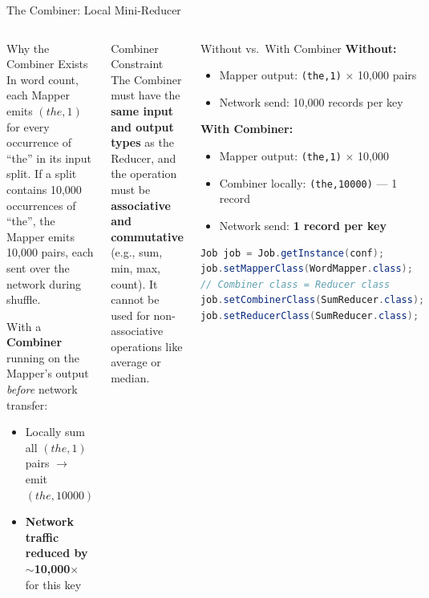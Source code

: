 \documentclass[aspectratio=169,10pt]{beamer}
\begin{document}
\begin{frame}[fragile]{The Combiner: Local Mini-Reducer}
  \begin{columns}[T]
      \begin{block}{Why the Combiner Exists}
        In word count, each Mapper emits $(the, 1)$ for every occurrence of ``the'' in its input split.  If a split contains 10{,}000 occurrences of ``the'', the Mapper emits 10{,}000 pairs, each sent over the network during shuffle.
        \vspace{4pt}

        With a \textbf{Combiner} running on the Mapper's output \emph{before} network transfer:
        \begin{itemize}
          \item Locally sum all $(the, 1)$ pairs $\to$ emit $(the, 10000)$
          \item \textbf{Network traffic reduced by $\sim$10{,}000$\times$} for this key
        \end{itemize}
      \end{block}
      \vspace{4pt}
      \begin{alertblock}{Combiner Constraint}
        The Combiner must have the \textbf{same input and output types} as the Reducer, and the operation must be \textbf{associative and commutative} (e.g., sum, min, max, count).  It \alert{cannot} be used for non-associative operations like average or median.
      \end{alertblock}

      \begin{exampleblock}{Without vs.\ With Combiner}
        \textbf{Without:}
        \begin{itemize}
          \small
          \item Mapper output: \texttt{(the,1)} $\times$ 10{,}000 pairs
          \item Network send: 10{,}000 records per key
        \end{itemize}
        \vspace{6pt}
        \textbf{With Combiner:}
        \begin{itemize}
          \small
          \item Mapper output: \texttt{(the,1)} $\times$ 10{,}000
          \item Combiner locally: \texttt{(the,10000)} — 1 record
          \item Network send: \textbf{1 record per key}
        \end{itemize}
        \vspace{6pt}
        \begin{lstlisting}[language=Java, title={Java: Setting Combiner}]
Job job = Job.getInstance(conf);
job.setMapperClass(WordMapper.class);
// Combiner class = Reducer class
job.setCombinerClass(SumReducer.class);
job.setReducerClass(SumReducer.class);
        \end{lstlisting}
      \end{exampleblock}
  \end{columns}
\end{frame}
\end{document}
